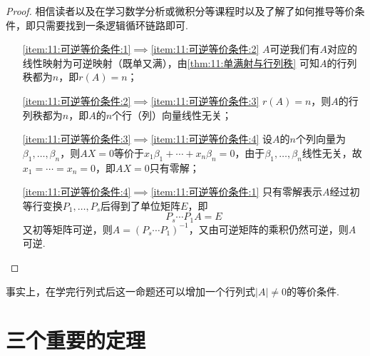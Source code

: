 \begin{proof}
    相信读者以及在学习数学分析或微积分等课程时以及了解了如何推导等价条件，即只需要找到一条逻辑循环链路即可.
    \begin{itemize}
        \item[\ref*{item:11:可逆等价条件:1}$\implies$\ref*{item:11:可逆等价条件:2}] $A$可逆我们有$A$对应的线性映射为可逆映射（既单又满），由\autoref{thm:11:单满射与行列秩} 可知$A$的行列秩都为$n$，即$r(A)=n$；

        \item[\ref*{item:11:可逆等价条件:2}$\implies$\ref*{item:11:可逆等价条件:3}] $r(A)=n$，则$A$的行列秩都为$n$，即$A$的$n$个行（列）向量线性无关；

        \item[\ref*{item:11:可逆等价条件:3}$\implies$\ref*{item:11:可逆等价条件:4}] 设$A$的$n$个列向量为$\beta_1,\ldots,\beta_n$，则$AX=0$等价于$x_1\beta_1+\cdots+x_n\beta_n=0$，由于$\beta_1,\ldots,\beta_n$线性无关，故$x_1=\cdots=x_n=0$，即$AX=0$只有零解；

        \item[\ref*{item:11:可逆等价条件:4}$\implies$\ref*{item:11:可逆等价条件:1}] 只有零解表示$A$经过初等行变换$P_1,\ldots,P_s$后得到了单位矩阵$E$，即
            \[P_s\cdots P_1A=E\]
            又初等矩阵可逆，则$A=(P_s\cdots P_1)^{-1}$，又由可逆矩阵的乘积仍然可逆，则$A$可逆.
    \end{itemize}
\end{proof}

事实上，在学完行列式后这一命题还可以增加一个行列式$|A|\neq 0$的等价条件.

\section{三个重要的定理}

